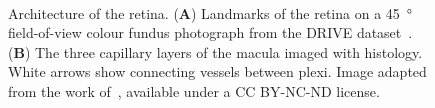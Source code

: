 \documentclass[11pt,]{article}
\begin{document}
\begin{figure}[ht!] \centering
    \centering
  \begin{subfigure}[t]{.02\textwidth}
  \end{subfigure}
  \begin{subfigure}[t]{.58\textwidth}
  \end{subfigure}
  \\
  \begin{subfigure}[t]{.02\textwidth}
  \end{subfigure}
  \begin{subfigure}[t]{.58\textwidth}
  \end{subfigure}
  \caption{Architecture of the retina. (\textbf{A}) Landmarks of the retina on a \SI{45}{\degree} field-of-view colour fundus photograph from the DRIVE dataset~\cite{Staal_2004}.
  (\textbf{B}) The three capillary layers of the macula imaged with histology. White arrows show connecting vessels between plexi. Image adapted from the work of~\cite{An2020}, available under a CC BY-NC-ND license.}
  \label{fig:1}
\end{figure}
\end{document}
